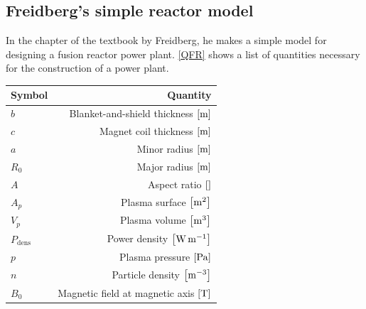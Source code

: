 \subsection{Freidberg's simple reactor model}
In the  chapter of the textbook by Freidberg\cite{freidberg_plasma_2007}, he makes a simple model for designing a fusion reactor power plant. \cref{QFR} shows a list of quantities necessary for the construction of a power plant.
\begin{table}
	\begin{tabular}{lr}
		\toprule
		Symbol                    & Quantity                                                                                               \\
		\midrule
		\(b\)                     & Blanket-and-shield thickness \(\bqty{\si{\meter}}\)                                                    \\
		\(c\)                     & Magnet coil thickness \(\bqty{\si{\meter}}\)                                                           \\
		\(a\)                     & Minor radius \(\bqty{\si{\meter}}\)                                                                    \\
		\(R_0\)                   & Major radius \(\bqty{\si{\meter}}\)                                                                    \\
		\(A\)                     & Aspect ratio \(\bqty{}\)                                                                               \\
		\(A_p\)                   & Plasma surface \(\bqty{\si{\meter\squared}}\)                                                          \\
		\(V_p\)                   & Plasma volume \(\bqty{\si{\meter\cubed}}\)                                                             \\
		\(P_\mathrm{dens}\)       & Power density \(\bqty{\si{\watt\per\meter}}\)                                                          \\
		\(p\)                     & Plasma pressure \(\bqty{\si{\pascal}}\)                                                                \\
		\(n\)                     & Particle density \(\bqty{\si{\per\meter\cubed}}\)                                                      \\
		\(B_0\)                   & Magnetic field at magnetic axis \(\bqty{\si{\tesla}}\)                                                 \\

\end{tabular}
\end{table}

